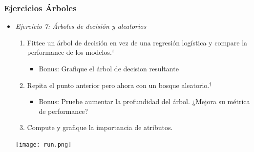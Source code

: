 \documentclass[leqno, 10pt, envcountsect]{beamer}
\numberwithin{equation}{section}
\theoremstyle{definition}
\theoremstyle{example}
\numberwithin{figure}{section}
\numberwithin{table}{section}
\let\olditem\item
\renewcommand{\item}{%
\olditem\vspace{1pt}}
\begin{document}
\begin{frame}[fragile=singleslide]
  \frametitle{Ejercicios Árboles}
  \begin{itemize}
    \item \textit{Ejercicio 7: Árboles de decisión y aleatorios}
      \begin{enumerate}
        \item Fittee un árbol de decisión en vez de una regresión logística y
          compare la performance de los modelos.$^{\dag}$
          \begin{itemize}
            \item Bonus: Grafique el árbol de decision resultante
          \end{itemize}
        \item Repita el punto anterior pero ahora con un bosque
          aleatorio.$^{\dag}$
          \begin{itemize}
            \item Bonus: Pruebe aumentar la profundidad del árbol. ¿Mejora su métrica de
                    performance?
          \end{itemize}
        \item Compute y grafique la importancia de atributos.
      \end{enumerate}
      \begin{center}
        \texttt{[image: run.png]}
      \end{center}
  \end{itemize}

\end{frame}
\end{document}
